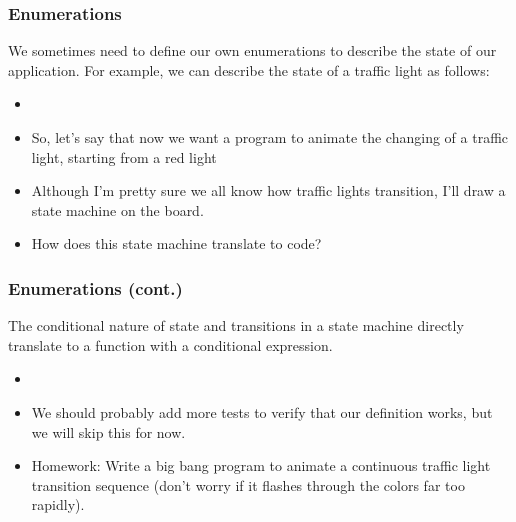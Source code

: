 \documentclass{beamer}
\begin{document}

\begin{frame}
  \frametitle{Enumerations}
  We sometimes need to define our own enumerations to describe
  the state of our application. For example, we can describe
  the state of a traffic light as follows:
  \begin{itemize}
  \item<2-> \trafficEnum
  \item<3-> So, let's say that now we want a program to animate the changing
    of a traffic light, starting from a red light
  \item<4-> Although I'm pretty sure we all know how traffic lights transition,
    I'll draw a state machine on the board.
  \item<5-> How does this state machine translate to code?    
  \end{itemize}
\end{frame}


\begin{frame}
  \frametitle{Enumerations (cont.)}
  The conditional nature of state and transitions in a state machine
  directly translate to a function with a conditional expression.
  \begin{itemize}
  \item<2-> \trafficTransition
  \item<3-> We should probably add more tests to verify that our definition
    works, but we will skip this for now.
  \item<4-> Homework: Write a big bang program to animate a continuous
    traffic light transition sequence (don't worry if it flashes through the
    colors far too rapidly).
  \end{itemize}
\end{frame}
\end{document}
